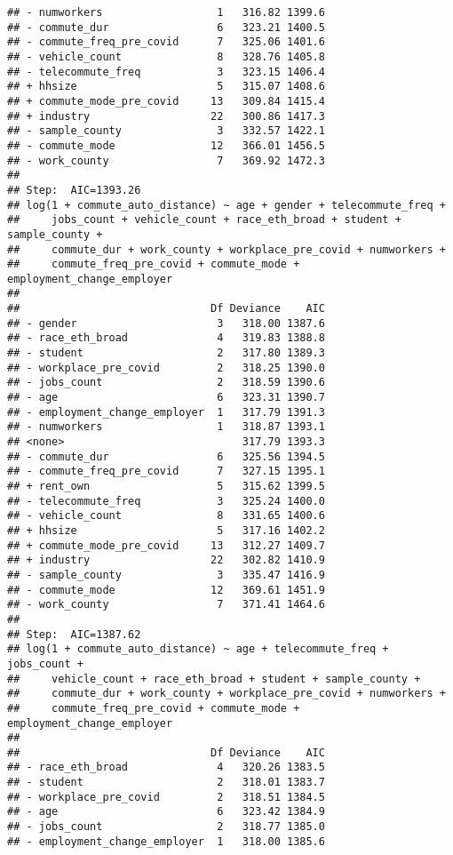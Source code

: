 \documentclass[
]{article}
\begin{document}
\begin{verbatim}
## - numworkers                  1   316.82 1399.6
## - commute_dur                 6   323.21 1400.5
## - commute_freq_pre_covid      7   325.06 1401.6
## - vehicle_count               8   328.76 1405.8
## - telecommute_freq            3   323.15 1406.4
## + hhsize                      5   315.07 1408.6
## + commute_mode_pre_covid     13   309.84 1415.4
## + industry                   22   300.86 1417.3
## - sample_county               3   332.57 1422.1
## - commute_mode               12   366.01 1456.5
## - work_county                 7   369.92 1472.3
## 
## Step:  AIC=1393.26
## log(1 + commute_auto_distance) ~ age + gender + telecommute_freq + 
##     jobs_count + vehicle_count + race_eth_broad + student + sample_county + 
##     commute_dur + work_county + workplace_pre_covid + numworkers + 
##     commute_freq_pre_covid + commute_mode + employment_change_employer
## 
##                              Df Deviance    AIC
## - gender                      3   318.00 1387.6
## - race_eth_broad              4   319.83 1388.8
## - student                     2   317.80 1389.3
## - workplace_pre_covid         2   318.25 1390.0
## - jobs_count                  2   318.59 1390.6
## - age                         6   323.31 1390.7
## - employment_change_employer  1   317.79 1391.3
## - numworkers                  1   318.87 1393.1
## <none>                            317.79 1393.3
## - commute_dur                 6   325.56 1394.5
## - commute_freq_pre_covid      7   327.15 1395.1
## + rent_own                    5   315.62 1399.5
## - telecommute_freq            3   325.24 1400.0
## - vehicle_count               8   331.65 1400.6
## + hhsize                      5   317.16 1402.2
## + commute_mode_pre_covid     13   312.27 1409.7
## + industry                   22   302.82 1410.9
## - sample_county               3   335.47 1416.9
## - commute_mode               12   369.61 1451.9
## - work_county                 7   371.41 1464.6
## 
## Step:  AIC=1387.62
## log(1 + commute_auto_distance) ~ age + telecommute_freq + jobs_count + 
##     vehicle_count + race_eth_broad + student + sample_county + 
##     commute_dur + work_county + workplace_pre_covid + numworkers + 
##     commute_freq_pre_covid + commute_mode + employment_change_employer
## 
##                              Df Deviance    AIC
## - race_eth_broad              4   320.26 1383.5
## - student                     2   318.01 1383.7
## - workplace_pre_covid         2   318.51 1384.5
## - age                         6   323.42 1384.9
## - jobs_count                  2   318.77 1385.0
## - employment_change_employer  1   318.00 1385.6

\end{verbatim}
\end{document}
